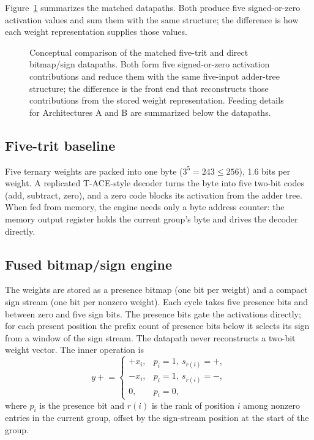 \documentclass[11pt]{article}
\begin{document}
Figure~\ref{fig:architecture-overview} summarizes the matched datapaths. Both produce five signed-or-zero activation values and sum them with the same structure; the difference is how each weight representation supplies those values.

\begin{figure}[t]
\centering
\resizebox{\linewidth}{!}{}
\caption{Conceptual comparison of the matched five-trit and direct bitmap/sign datapaths. Both form five signed-or-zero activation contributions and reduce them with the same five-input adder-tree structure; the difference is the front end that reconstructs those contributions from the stored weight representation. Feeding details for Architectures A and B are summarized below the datapaths.}
\label{fig:architecture-overview}
\end{figure}

\subsection{Five-trit baseline}

Five ternary weights are packed into one byte ($3^5=243\le256$), 1.6 bits per weight. A replicated T-ACE-style decoder \cite{jung2026tace} turns the byte into five two-bit codes (add, subtract, zero), and a zero code blocks its activation from the adder tree. When fed from memory, the engine needs only a byte address counter: the memory output register holds the current group's byte and drives the decoder directly.

\subsection{Fused bitmap/sign engine}

The weights are stored as a presence bitmap (one bit per weight) and a compact sign stream (one bit per nonzero weight). Each cycle takes five presence bits and between zero and five sign bits. The presence bits gate the activations directly; for each present position the prefix count of presence bits below it selects its sign from a window of the sign stream. The datapath never reconstructs a two-bit weight vector. The inner operation is
\begin{equation}
y \mathrel{+}= 
\begin{cases}
+x_i, & p_i=1,\ s_{r(i)}=+,\\
-x_i, & p_i=1,\ s_{r(i)}=-,\\
0, & p_i=0,
\end{cases}
\end{equation}
where $p_i$ is the presence bit and $r(i)$ is the rank of position $i$ among nonzero entries in the current group, offset by the sign-stream position at the start of the group.
\end{document}
